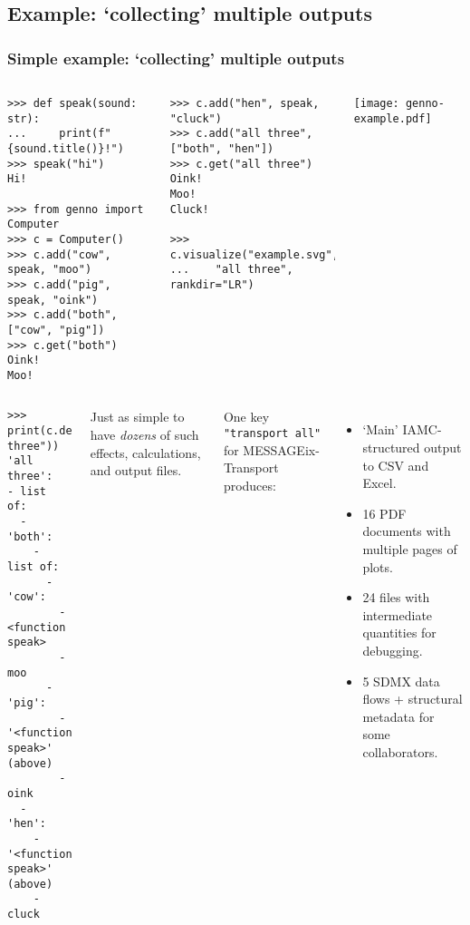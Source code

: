 \documentclass[12pt,aspectratio=169]{beamer}
\newcommand{\py}[1]{\texttt{#1}}
\begin{document}
\subsection{Example: ‘collecting' multiple outputs}

\begin{frame}
\frametitle{Simple example: ‘collecting' multiple outputs}

\begin{columns}[T]
\begin{verbatim}
>>> def speak(sound: str):
...     print(f"{sound.title()}!")
>>> speak("hi")
Hi!

>>> from genno import Computer
>>> c = Computer()
>>> c.add("cow", speak, "moo")
>>> c.add("pig", speak, "oink")
>>> c.add("both", ["cow", "pig"])
>>> c.get("both")
Oink!
Moo!
\end{verbatim}

\begin{verbatim}
>>> c.add("hen", speak, "cluck")
>>> c.add("all three", ["both", "hen"])
>>> c.get("all three")
Oink!
Moo!
Cluck!

>>> c.visualize("example.svg",
...    "all three", rankdir="LR")
\end{verbatim}

\texttt{[image: genno-example.pdf]}
\end{columns}

\framebreak
\begin{columns}[T]
\column{0.4\paperwidth}
\begin{verbatim}
>>> print(c.describe("all three"))
'all three':
- list of:
  - 'both':
    - list of:
      - 'cow':
        - <function speak>
        - moo
      - 'pig':
        - '<function speak>' (above)
        - oink
  - 'hen':
    - '<function speak>' (above)
    - cluck
\end{verbatim}

\column{0.5\paperwidth}
Just as simple to have \emph{dozens} of such effects, calculations, and output files.

\smallskip
One key \py{"transport all"} for MESSAGEix-Transport produces:
\begin{itemize}
  \item ‘Main' IAMC-structured output to CSV and Excel.
  \item 16 PDF documents with multiple pages of plots.
  \item 24 files with intermediate quantities for debugging.
  \item 5 SDMX data flows + structural metadata for some collaborators.
\end{itemize}
\end{columns}
\end{frame}
\end{document}
